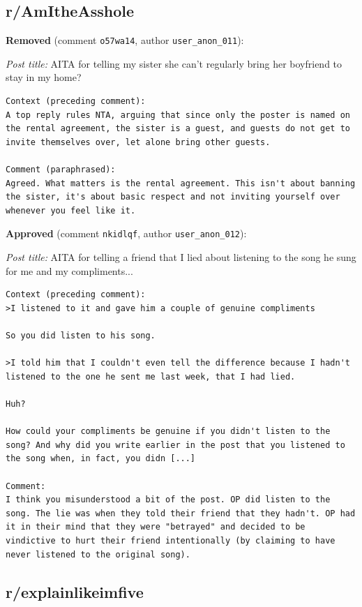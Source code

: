 \subsection*{r/AmItheAsshole}

\noindent\textbf{Removed} (comment \texttt{o57wa14}, author \texttt{user\_anon\_011}):

\noindent\emph{Post title:} AITA for telling my sister she can't regularly bring her boyfriend to stay in my home?

\begin{lstlisting}
Context (preceding comment):
A top reply rules NTA, arguing that since only the poster is named on the rental agreement, the sister is a guest, and guests do not get to invite themselves over, let alone bring other guests.

Comment (paraphrased):
Agreed. What matters is the rental agreement. This isn't about banning the sister, it's about basic respect and not inviting yourself over whenever you feel like it.
\end{lstlisting}

\noindent\textbf{Approved} (comment \texttt{nkidlqf}, author \texttt{user\_anon\_012}):

\noindent\emph{Post title:} AITA for telling a friend that I lied about listening to the song he sung for me and my compliments...

\begin{lstlisting}
Context (preceding comment):
>I listened to it and gave him a couple of genuine compliments

So you did listen to his song.

>I told him that I couldn't even tell the difference because I hadn't listened to the one he sent me last week, that I had lied.

Huh?

How could your compliments be genuine if you didn't listen to the song? And why did you write earlier in the post that you listened to the song when, in fact, you didn [...]

Comment:
I think you misunderstood a bit of the post. OP did listen to the song. The lie was when they told their friend that they hadn't. OP had it in their mind that they were "betrayed" and decided to be vindictive to hurt their friend intentionally (by claiming to have never listened to the original song).
\end{lstlisting}


\subsection*{r/explainlikeimfive}

